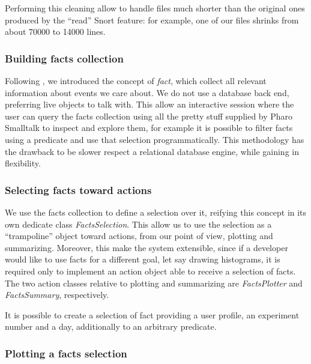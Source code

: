 \documentclass[10pt,a4paper]{article}
\begin{document}
    Performing this cleaning allow to handle files much shorter than
    the original ones produced by the ``read'' Snort feature: for
    example, one of our files shrinks from about 70000 to 14000 lines.

    \subsubsection{Building facts collection}

    Following \cite{bondavalli}, we introduced the concept of
    \emph{fact}, which collect all relevant information about events
    we care about. We do not use a database back end, preferring live
    objects to talk with. This allow an interactive session where the
    user can query the facts collection using all the pretty stuff
    supplied by Pharo Smalltalk to inspect and explore them, for
    example it is possible to filter facts using a predicate and use
    that selection programmatically. This methodology has the drawback
    to be slower respect a relational database engine, while gaining
    in flexibility.

    \subsubsection{Selecting facts toward actions}
    
    We use the facts collection to define a selection over it,
    reifying this concept in its own dedicate class
    \emph{FactsSelection}. This allow us to use the selection as a
    ``trampoline'' object \cite{weiher-ducasse} toward actions, from
    our point of view, plotting and summarizing. Moreover, this make
    the system extensible, since if a developer would like to use
    facts for a different goal, let say drawing histograms, it is
    required only to implement an action object able to receive a
    selection of facts. The two action classes relative to plotting
    and summarizing are \emph{FactsPlotter} and \emph{FactsSummary},
    respectively.

    It is possible to create a selection of fact providing a user
    profile, an experiment number and a day, additionally to an
    arbitrary predicate.

    \subsubsection{Plotting a facts selection}
\end{document}

